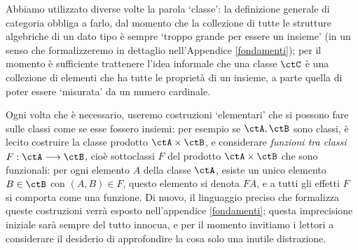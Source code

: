Abbiamo utilizzato diverse volte la parola `classe': la definizione generale di categoria obbliga a farlo, dal momento che la collezione di tutte le strutture algebriche di un dato tipo è sempre `troppo grande per essere un insieme' (in un senso che formalizzeremo in dettaglio nell'Appendice \ref{fondamenti}); per il momento è sufficiente trattenere l'idea informale che una classe $\ctC$ è una collezione di elementi che ha tutte le proprietà di un insieme, a parte quella di poter essere `misurata' da un numero cardinale.

Ogni volta che è necessario, useremo costruzioni `elementari' che si possono fare sulle classi come se esse fossero insiemi: per esempio se $\ctA,\ctB$ sono classi, è lecito costruire la classe prodotto $\ctA\times\ctB$, e considerare \emph{funzioni tra classi} $F : \ctA\fun\ctB$, cioè sottoclassi $F$ del prodotto $\ctA\times\ctB$ che sono funzionali: per ogni elemento $A$ della classe $\ctA$, esiste un unico elemento $B\in\ctB$ con $(A,B)\in F$, questo elemento si denota $FA$, e a tutti gli effetti $F$ si comporta come una funzione. Di nuovo, il linguaggio preciso che formalizza queste costruzioni verrà esposto nell'appendice \ref{fondamenti}; questa imprecisione iniziale sarà sempre del tutto innocua, e per il momento invitiamo i lettori a considerare il desiderio di approfondire la cosa solo una inutile distrazione.
